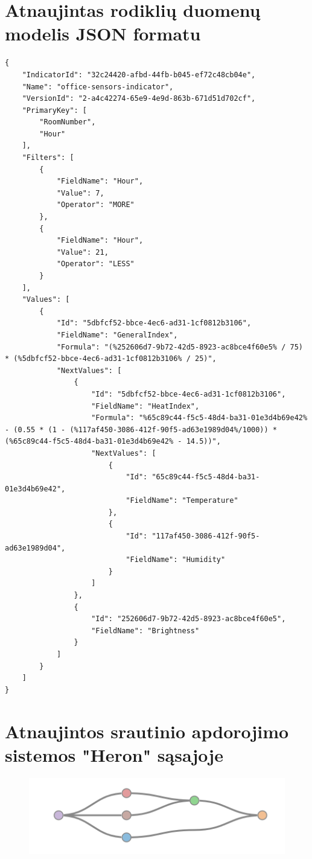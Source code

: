 \documentclass{VUMIFPSbakalaurinis}
\begin{document}
\section{Atnaujintas rodiklių duomenų modelis JSON formatu}\label{add:changed-json}
\begin{lstlisting}
{
    "IndicatorId": "32c24420-afbd-44fb-b045-ef72c48cb04e",
    "Name": "office-sensors-indicator",
    "VersionId": "2-a4c42274-65e9-4e9d-863b-671d51d702cf",
    "PrimaryKey": [
        "RoomNumber",
        "Hour"
    ],
    "Filters": [
        {
            "FieldName": "Hour",
            "Value": 7,
            "Operator": "MORE"
        },
        {
            "FieldName": "Hour",
            "Value": 21,
            "Operator": "LESS"
        }
    ],
    "Values": [
        {
            "Id": "5dbfcf52-bbce-4ec6-ad31-1cf0812b3106",
            "FieldName": "GeneralIndex",
            "Formula": "(%252606d7-9b72-42d5-8923-ac8bce4f60e5% / 75) * (%5dbfcf52-bbce-4ec6-ad31-1cf0812b3106% / 25)",
            "NextValues": [
                {
                    "Id": "5dbfcf52-bbce-4ec6-ad31-1cf0812b3106",
                    "FieldName": "HeatIndex",
                    "Formula": "%65c89c44-f5c5-48d4-ba31-01e3d4b69e42% - (0.55 * (1 - (%117af450-3086-412f-90f5-ad63e1989d04%/1000)) * (%65c89c44-f5c5-48d4-ba31-01e3d4b69e42% - 14.5))",
                    "NextValues": [
                        {
                            "Id": "65c89c44-f5c5-48d4-ba31-01e3d4b69e42",
                            "FieldName": "Temperature"
                        },
                        {
                            "Id": "117af450-3086-412f-90f5-ad63e1989d04",
                            "FieldName": "Humidity"
                        }
                    ]
                },
                {
                    "Id": "252606d7-9b72-42d5-8923-ac8bce4f60e5",
                    "FieldName": "Brightness"
                }
            ]
        }
    ]
}
\end{lstlisting}


\section{Atnaujintos srautinio apdorojimo sistemos "Heron" sąsajoje}\label{add:generated-system2}
\begin{figure}[H]
    \centering
    \includegraphics[width=1\textwidth]{img/generated-topology-2.png}
    \label{img:generated-data}
\end{figure}
\end{document}
